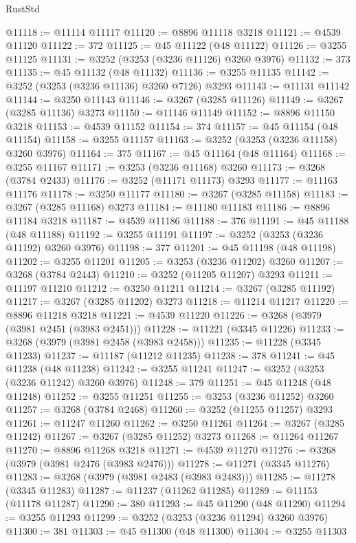 \begin{lexlean}{RustStd}
\begin{coremodule}
{\begin{coremodule}
{{{{{{{{{{{{{{{{{{{{{{{{{{{{{{{{{{{{{{{@11118 := @11114 @11117
@11120 := @8896 @11118 @3218
@11121 := @4539 @11120
@11122 := 372
@11125 := @45 @11122 (@48 @11122)
@11126 := @3255 @11125
@11131 := @3252 (@3253 (@3236 @11126) @3260 @3976)
@11132 := 373
@11135 := @45 @11132 (@48 @11132)
@11136 := @3255 @11135
@11142 := @3252 (@3253 (@3236 @11136) @3260 @7126) @3293
@11143 := @11131 @11142
@11144 := @3250 @11143
@11146 := @3267 (@3285 @11126)
@11149 := @3267 (@3285 @11136) @3273
@11150 := @11146 @11149
@11152 := @8896 @11150 @3218
@11153 := @4539 @11152
@11154 := 374
@11157 := @45 @11154 (@48 @11154)
@11158 := @3255 @11157
@11163 := @3252 (@3253 (@3236 @11158) @3260 @3976)
@11164 := 375
@11167 := @45 @11164 (@48 @11164)
@11168 := @3255 @11167
@11171 := @3253 (@3236 @11168) @3260
@11173 := @3268 (@3784 @2433)
@11176 := @3252 (@11171 @11173) @3293
@11177 := @11163 @11176
@11178 := @3250 @11177
@11180 := @3267 (@3285 @11158)
@11183 := @3267 (@3285 @11168) @3273
@11184 := @11180 @11183
@11186 := @8896 @11184 @3218
@11187 := @4539 @11186
@11188 := 376
@11191 := @45 @11188 (@48 @11188)
@11192 := @3255 @11191
@11197 := @3252 (@3253 (@3236 @11192) @3260 @3976)
@11198 := 377
@11201 := @45 @11198 (@48 @11198)
@11202 := @3255 @11201
@11205 := @3253 (@3236 @11202) @3260
@11207 := @3268 (@3784 @2443)
@11210 := @3252 (@11205 @11207) @3293
@11211 := @11197 @11210
@11212 := @3250 @11211
@11214 := @3267 (@3285 @11192)
@11217 := @3267 (@3285 @11202) @3273
@11218 := @11214 @11217
@11220 := @8896 @11218 @3218
@11221 := @4539 @11220
@11226 := @3268 (@3979 (@3981 @2451 (@3983 @2451)))
@11228 := @11221 (@3345 @11226)
@11233 := @3268 (@3979 (@3981 @2458 (@3983 @2458)))
@11235 := @11228 (@3345 @11233)
@11237 := @11187 (@11212 @11235)
@11238 := 378
@11241 := @45 @11238 (@48 @11238)
@11242 := @3255 @11241
@11247 := @3252 (@3253 (@3236 @11242) @3260 @3976)
@11248 := 379
@11251 := @45 @11248 (@48 @11248)
@11252 := @3255 @11251
@11255 := @3253 (@3236 @11252) @3260
@11257 := @3268 (@3784 @2468)
@11260 := @3252 (@11255 @11257) @3293
@11261 := @11247 @11260
@11262 := @3250 @11261
@11264 := @3267 (@3285 @11242)
@11267 := @3267 (@3285 @11252) @3273
@11268 := @11264 @11267
@11270 := @8896 @11268 @3218
@11271 := @4539 @11270
@11276 := @3268 (@3979 (@3981 @2476 (@3983 @2476)))
@11278 := @11271 (@3345 @11276)
@11283 := @3268 (@3979 (@3981 @2483 (@3983 @2483)))
@11285 := @11278 (@3345 @11283)
@11287 := @11237 (@11262 @11285)
@11289 := @11153 (@11178 @11287)
@11290 := 380
@11293 := @45 @11290 (@48 @11290)
@11294 := @3255 @11293
@11299 := @3252 (@3253 (@3236 @11294) @3260 @3976)
@11300 := 381
@11303 := @45 @11300 (@48 @11300)
@11304 := @3255 @11303
}}}}}}}}}}}}}}}}}}}}}}}}}}}}}}}}}}}}}}}
\end{coremodule}}
\end{coremodule}
\end{lexlean}
